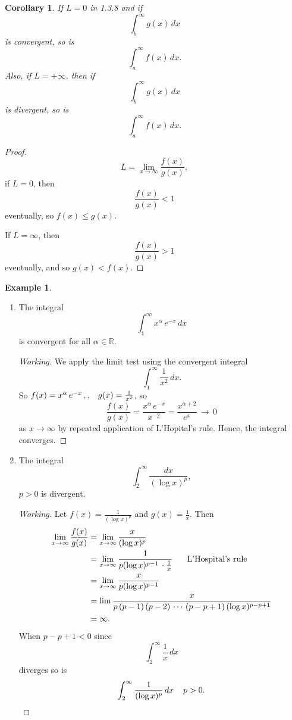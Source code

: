 \documentclass[12pt,a4paper]{report}
\theoremstyle{definition}
\newtheorem{exa}[thm]{Example}
\theoremstyle{plain}
\newtheorem{coro}[thm]{Corollary}
\begin{document}
\begin{coro}
If $L=0$ in 1.3.8 and if $$\int_b^{\infty}g(x)\, dx$$ is convergent, so is $$\int_a^{\infty} f(x)\, dx.$$ Also, if $L = +\infty$, then if $$\int_b^{\infty} g(x) \, dx $$ is divergent, so  is $$\int_a^{\infty}f(x)\, dx.$$
\end{coro}

\begin{proof}
$$L  = \lim_{x\rightarrow \infty} \frac{f(x)}{g(x)},$$  if $L = 0$, then $$\frac{f(x)}{g(x)} < 1$$ eventually, so $f(x) \leq g(x)$. 

If $L = \infty$, then $$\frac{f(x)}{g(x)} > 1$$ eventually, and so $g(x) < f(x)$.
\end{proof}




\begin{exa}\textbf{}
\hspace*{-5mm}
\begin{enumerate}
\item[(a).] The integral $$\int_1^{\infty} x^{\alpha}\, e^{-x}\, dx$$ is convergent for all $\alpha \in \mathbb{R}$.

\begin{proof}[Working]
We apply the limit test using the convergent integral $$\int_1^{\infty} \frac{1}{x^2}\, dx.$$ So $f(x) = x^{\alpha}\, e^{-x}\, ,, \hspace{0.3cm} g(x) = \frac{1}{x^2}$, so $$\frac{f(x)}{g(x)} = \frac{x^{\alpha}\, e^{-x}}{x^{-2}} = \frac{x^{\alpha + 2}}{e^{x}}\, \longrightarrow \, 0$$ as $x \rightarrow \infty$ by repeated application of L'Hopital's rule. Hence, the integral converges.
\end{proof}



\item[(b).] The integral $$\int_2^{\infty} \frac{dx}{(\log x)^p},$$ $p>0$ is divergent.

\begin{proof}[Working]
Let $f(x) = \frac{1}{(\log x)^p}$ and $g(x) = \frac{1}{x}$. Then 
\begin{align*}
\lim_{x\rightarrow \infty} \frac{f(x)}{g(x)} & = \lim_{x\rightarrow \infty} \frac{x}{(\log x)^p}\\
                                             & = \lim_{x\rightarrow \infty} \frac{1}{p(\log x)^{p-1}\, \cdot\frac{1}{x}}\hspace{0.6cm} \text{L'Hospital's rule}\\
                                             & = \lim_{x \rightarrow \infty} \frac{x}{p(\log x)^{p-1}}\\
                                             & = \lim\frac{x}{p\, (p-1)\, (p-2)\, \cdots\, (p-p+1)\, (\log x)^{p-p+1}}\\
                                             & = \infty.
\end{align*}
When $p-p + 1 < 0$ since $$\int_2^{\infty}\frac{1}{x}\, dx$$ diverges so is $$\int_2^{\infty} \frac{1}{(\log x)^p}\, dx \hspace{0.4cm} p > 0.$$
\end{proof}
\end{enumerate}
\end{exa}
\end{document}
